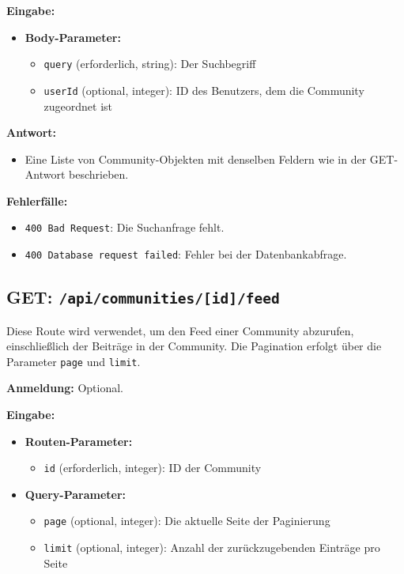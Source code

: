 \documentclass[a4paper,12pt]{article}
\begin{document}
\textbf{Eingabe:}
\begin{itemize}
    \item \textbf{Body-Parameter:}
    \begin{itemize}
        \item \texttt{query} (erforderlich, string): Der Suchbegriff
        \item \texttt{userId} (optional, integer): ID des Benutzers, dem die Community zugeordnet ist
    \end{itemize}
\end{itemize}

\textbf{Antwort:}
\begin{itemize}
    \item Eine Liste von Community-Objekten mit denselben Feldern wie in der GET-Antwort beschrieben.
\end{itemize}

\textbf{Fehlerfälle:}
\begin{itemize}
    \item \texttt{400 Bad Request}: Die Suchanfrage fehlt.
    \item \texttt{400 Database request failed}: Fehler bei der Datenbankabfrage.
\end{itemize}

\newpage
\subsection{GET: \texttt{/api/communities/[id]/feed}}

Diese Route wird verwendet, um den Feed einer Community abzurufen, einschließlich der Beiträge in der Community. Die Pagination erfolgt über die Parameter \texttt{page} und \texttt{limit}.

\textbf{Anmeldung:} Optional.

\textbf{Eingabe:}
\begin{itemize}
    \item \textbf{Routen-Parameter:}
    \begin{itemize}
        \item \texttt{id} (erforderlich, integer): ID der Community
    \end{itemize}
    \item \textbf{Query-Parameter:}
    \begin{itemize}
        \item \texttt{page} (optional, integer): Die aktuelle Seite der Paginierung
        \item \texttt{limit} (optional, integer): Anzahl der zurückzugebenden Einträge pro Seite
    \end{itemize}
\end{itemize}
\end{document}
